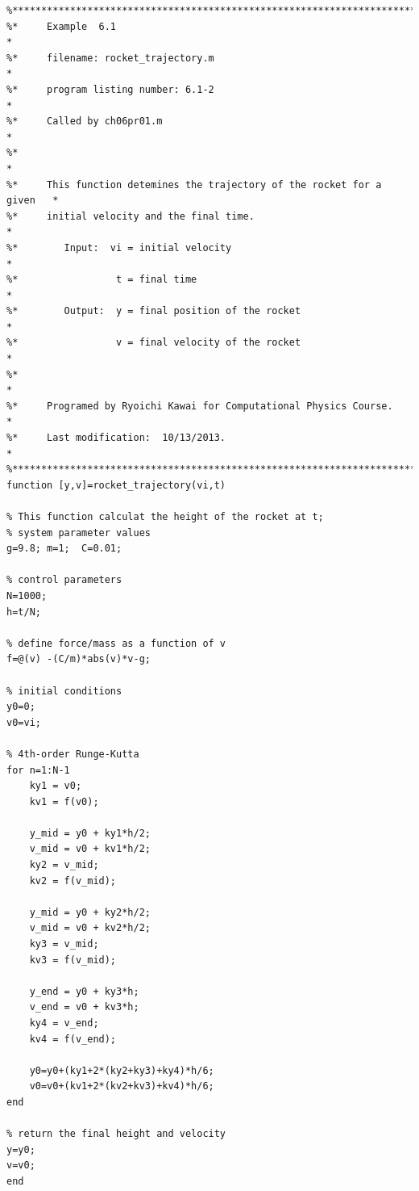 \begin{verbatim}
%**************************************************************************
%*     Example  6.1                                                       *
%*     filename: rocket_trajectory.m                                      *
%*     program listing number: 6.1-2                                      *
%*     Called by ch06pr01.m                                               *
%*                                                                        *
%*     This function detemines the trajectory of the rocket for a given   *
%*     initial velocity and the final time.                               *
%*        Input:  vi = initial velocity                                   *
%*                 t = final time                                         *
%*        Output:  y = final position of the rocket                       *
%*                 v = final velocity of the rocket                       *
%*                                                                        *
%*     Programed by Ryoichi Kawai for Computational Physics Course.       *
%*     Last modification:  10/13/2013.                                    *
%**************************************************************************
function [y,v]=rocket_trajectory(vi,t)

% This function calculat the height of the rocket at t;
% system parameter values
g=9.8; m=1;  C=0.01;

% control parameters
N=1000;
h=t/N;

% define force/mass as a function of v
f=@(v) -(C/m)*abs(v)*v-g;

% initial conditions
y0=0;
v0=vi;

% 4th-order Runge-Kutta
for n=1:N-1
    ky1 = v0;
    kv1 = f(v0);

    y_mid = y0 + ky1*h/2;
    v_mid = v0 + kv1*h/2;
    ky2 = v_mid;
    kv2 = f(v_mid);
      
    y_mid = y0 + ky2*h/2;
    v_mid = v0 + kv2*h/2;
    ky3 = v_mid;
    kv3 = f(v_mid);

    y_end = y0 + ky3*h;
    v_end = v0 + kv3*h;
    ky4 = v_end;
    kv4 = f(v_end);
    
    y0=y0+(ky1+2*(ky2+ky3)+ky4)*h/6;
    v0=v0+(kv1+2*(kv2+kv3)+kv4)*h/6;
end

% return the final height and velocity
y=y0;
v=v0;
end
\end{verbatim}
\normalsize


\bigskip
\noindent
\program
\label{prog:poisson1d}

